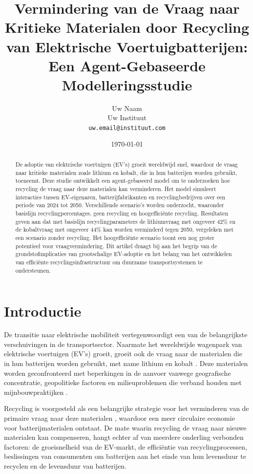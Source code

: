 \documentclass[10pt,a4paper,twocolumn]{article}
\title{Vermindering van de Vraag naar Kritieke Materialen door Recycling van Elektrische Voertuigbatterijen: Een Agent-Gebaseerde Modelleringsstudie}
\author{
        Uw Naam\\
        Uw Instituut\\
        \texttt{uw.email@instituut.com}
}
\date{\today}
\begin{document}
\maketitle

\begin{abstract}
De adoptie van elektrische voertuigen (EV's) groeit wereldwijd snel, waardoor de vraag naar kritieke materialen zoals lithium en kobalt, die in hun batterijen worden gebruikt, toeneemt. Deze studie ontwikkelt een agent-gebaseerd model om te onderzoeken hoe recycling de vraag naar deze materialen kan verminderen. Het model simuleert interacties tussen EV-eigenaren, batterijfabrikanten en recyclingbedrijven over een periode van 2024 tot 2050. Verschillende scenario's worden onderzocht, waaronder basislijn recyclingpercentages, geen recycling en hoogefficiënte recycling. Resultaten geven aan dat met basislijn recyclingparameters de lithiumvraag met ongeveer 42\% en de kobaltvraag met ongeveer 44\% kan worden verminderd tegen 2050, vergeleken met een scenario zonder recycling. Het hoogefficiënte scenario toont een nog groter potentieel voor vraagvermindering. Dit artikel draagt bij aan het begrip van de grondstofimplicaties van grootschalige EV-adoptie en het belang van het ontwikkelen van efficiënte recyclingsinfrastructuur om duurzame transportsystemen te ondersteunen.
\end{abstract}

\section{Introductie}
\label{sec:introduction}

De transitie naar elektrische mobiliteit vertegenwoordigt een van de belangrijkste verschuivingen in de transportsector. Naarmate het wereldwijde wagenpark van elektrische voertuigen (EV's) groeit, groeit ook de vraag naar de materialen die in hun batterijen worden gebruikt, met name lithium en kobalt \citep{olivetti2017}. Deze materialen worden geconfronteerd met beperkingen in de aanvoer vanwege geografische concentratie, geopolitieke factoren en milieuproblemen die verband houden met mijnbouwpraktijken \citep{dominish2019}.

Recycling is voorgesteld als een belangrijke strategie voor het verminderen van de primaire vraag naar deze materialen \citep{harper2019}, waardoor een meer circulaire economie voor batterijmaterialen ontstaat. De mate waarin recycling de vraag naar nieuwe materialen kan compenseren, hangt echter af van meerdere onderling verbonden factoren: de groeisnelheid van de EV-markt, de efficiëntie van recyclingprocessen, beslissingen van consumenten om batterijen aan het einde van hun levensduur te recyclen en de levensduur van batterijen.
\end{document}
